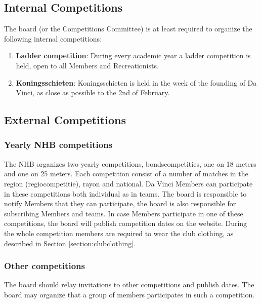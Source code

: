 \documentclass[a4paper]{article}
\begin{document}
\subsection{Internal Competitions}
The board (or the Competitions Committee) is at least required to organize the following internal competitions: \\
\begin{enumerate}
\item \textbf{Ladder competition}: During every academic year a ladder competition is held, open to all Members and Recreationists.
\item \textbf{Koningsschieten}: Koningsschieten is held in the week of the founding of Da Vinci, as close as possible to the 2nd of February.
\end{enumerate}

\subsection{External Competitions}
\subsubsection{Yearly NHB competitions}
The NHB organizes two yearly competitions, bondscompetities, one on 18 meters and one on 25 meters. Each competition consist of a number of matches in the region (regiocompetitie), rayon and national. Da Vinci Members can participate in these competitions both individual as in teams. The board is responsible to notify Members that they can participate, the board is also responsible for subscribing Members and teams. In case Members participate in one of these competitions, the board will publish competition dates on the website. During the whole competition members are required to wear the club clothing, as described in Section \ref{section:clubclothing}.

\subsubsection{Other competitions}
The board should relay invitations to other competitions and publish dates. The board may organize that a group of members participates in such a competition.
\end{document}
